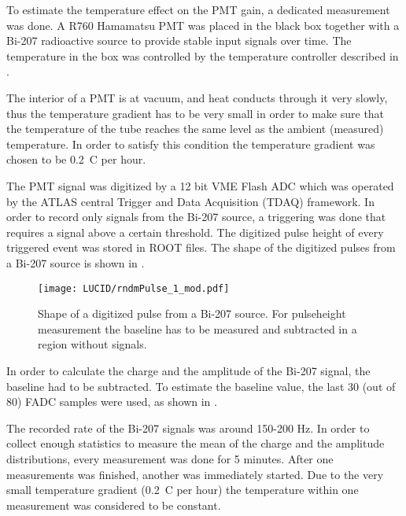 To estimate the temperature effect on the PMT gain, a dedicated measurement was done. 
A R760 Hamamatsu PMT was placed in the black box together with a Bi-207 radioactive source
to provide stable input signals over time. The temperature in the box was controlled by the temperature controller described in 
.

The interior of a PMT is at vacuum, and heat conducts through it very slowly, thus the temperature gradient has to be very small in order to make sure 
that the temperature of the tube reaches the same level as the ambient (measured) temperature.
In order to satisfy this condition the temperature gradient was chosen to be 0.2\degree~C per hour.

The PMT signal was digitized by a 12 bit VME Flash ADC which was operated by the ATLAS central Trigger and Data Acquisition (TDAQ) framework.
In order to record only signals from the Bi-207 source, a triggering was done that requires a signal above a certain threshold.
The digitized pulse height of every triggered event was stored in ROOT files.
The shape of the digitized pulses from a Bi-207 source is shown in . 

\begin{figure}
\centering
\texttt{[image: LUCID/rndmPulse\_1\_mod.pdf]}
\caption{Shape of a digitized pulse from a Bi-207 source. For pulseheight measurement the baseline has to be measured and subtracted in a region without signals.}
\label{fig:bi207DigitizedPulse}
\end{figure}

In order to calculate the charge and the amplitude of the Bi-207 signal, the baseline had to be subtracted. 
To estimate the baseline value, the last 30 (out of 80) FADC samples were used, as shown in .

The recorded rate of the Bi-207 signals was around 150-200 Hz. In order to collect enough statistics to measure the mean of the charge and 
the amplitude distributions, every measurement was done for 5 minutes. 
After one measurements was finished, another was immediately started.
Due to the very small temperature gradient (0.2\degree~C per hour) the temperature within one measurement was considered to be constant.

